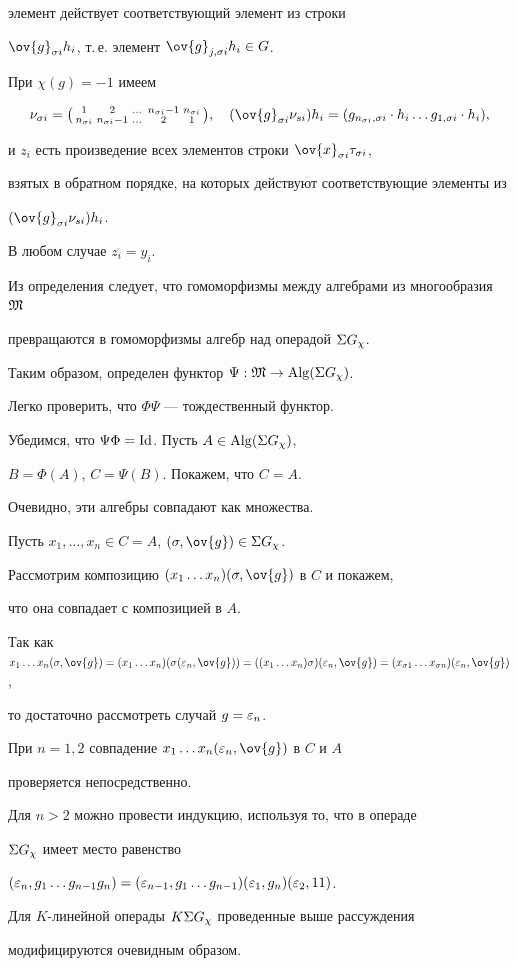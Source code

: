 \begin{pf}
элемент действует соответствующий элемент из строки


$\ov{g}_{\s{i}} h_i$, т.\,е. элемент $\ov{g}_{j,\s{i}}h_i \in G$.


При $\chi(g)=-1$ имеем


$$


\nu_{\s{i}}=


\textstyle{\mymat{1 & 2 & \dotsc & n_{\s{i}}-1 & n_{\s{i}} \\


n_{\s{i}} & n_{\s{i}}-1 & \dotsc & 2 & 1}},\quad


(\ov{g}_{\s{i}}\nu_{s{i}})h_{i}=


(g_{n_{\s{i}},\s{i}}\cdot h_{i} \dotsc g_{1,\s{i}} \cdot h_{i}),


$$


и $z_i$ есть произведение всех элементов строки $\ov{x}_{\s{i}}\t_{\s{i}}$,


взятых в обратном порядке, на которых действуют соответствующие элементы из


$(\ov{g}_{\s{i}}\nu_{s{i}})h_{i}$.


В любом случае $z_i=y_i$.


Из определения следует, что гомоморфизмы между алгебрами из многообразия ${\frak M}$


превращаются в гомоморфизмы алгебр над операдой $\Sigma G_{\chi}$.


Таким образом, определен функтор $\Psi: {\frak M} \rightarrow \operatorname{Alg}(\Sigma G_{\chi})$.


Легко проверить, что $\Phi \Psi$ --- тождественный функтор.


Убедимся, что $\Psi \Phi=\operatorname{Id}$. Пусть $A \in \operatorname{Alg}(\Sigma G_{\chi})$,


$B=\Phi(A)$, $C=\Psi(B)$. Покажем, что $C=A$.


Очевидно, эти алгебры совпадают как множества.


Пусть $x_1, \dotsc ,x_n \in C=A$, $(\s,\ov{g}) \in \sym G_{\chi}$.


Рассмотрим композицию $(x_1 \dotsc x_n)(\s,\ov{g})$ в $C$ и покажем,


 что она совпадает с композицией в $A$.


Так как $x_1 \dotsc x_n(\s,\ov{g})=(x_1 \dotsc x_n)(\s(\ep_n,\ov{g}))=


((x_1 \dotsc x_n)\s)(\ep_n,\ov{g})=(x_{\s1} \dotsc x_{\s{n}})(\ep_n,\ov{g})$,


то достаточно рассмотреть случай $g=\varepsilon_n$.


При $n=1,2$ совпадение $x_1 \dotsc x_n(\ep_n,\ov{g})$ в $C$ и $A$


проверяется непосредственно.


Для $n>2$ можно провести индукцию, используя то, что в операде


$\Sigma G_{\chi}$ имеет место равенство


$(\ep_n,g_1 \dotsc g_{n-1}g_n)=(\ep_{n-1},g_1


\dotsc g_{n-1})(\ep_1,g_n)(\ep_2,11)$.


Для $K$-линейной операды $K\Sigma G_{\chi}$ проведенные выше рассуждения


модифицируются очевидным образом.


\end{pf}
